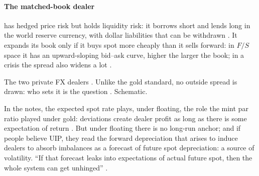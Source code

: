 \begin{paracol}{2}
\paragraph{The matched-book dealer} has hedged price risk but holds liquidity risk: it borrows short and lends long in the world reserve currency, with dollar
liabilities that can be withdrawn . It expands its book only if it buys spot more cheaply than it sells forward:
in $F/S$ space it has an upward-sloping bid--ask curve, higher the larger the book; in a crisis the spread also widens a lot .

\begin{nfigure}
\caption{The two private FX dealers . Unlike the gold standard, no outside spread is drawn: who sets it is the question
. Schematic.}\label{fig:fx-dealers}
\end{nfigure}

\begin{intuition}
In the notes, the expected spot rate plays, under floating, the role the mint par ratio played under gold: deviations create dealer profit as long as there is some expectation of return
. But under floating there is no long-run anchor; and if people believe UIP, they read the forward depreciation that arises to induce dealers to absorb imbalances as a forecast of
future spot depreciation: a source of volatility. ``If that forecast leaks into expectations of actual future spot, then the whole system can get unhinged'' .
\end{intuition}


\end{paracol}

